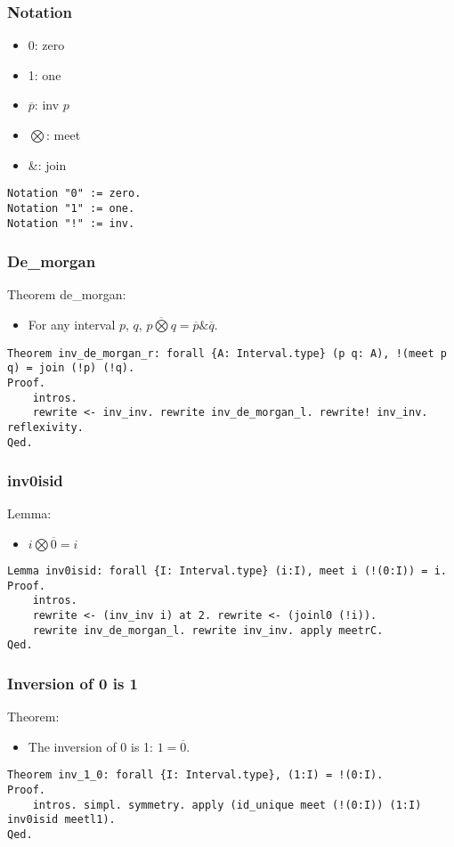 \documentclass[a4paper,10pt]{article} %
\begin{document}
\subsubsection{Notation}
\begin{itemize}
    \item 0: zero
    \item 1: one
    \item \(\overline{p}\): inv \(p\)
    \item \(\bigotimes\): meet
    \item \&: join
\end{itemize}
\begin{lstlisting}
Notation "0" := zero.
Notation "1" := one.
Notation "!" := inv.
\end{lstlisting}

\subsubsection{De\_morgan}
Theorem de\_morgan: 
\begin{itemize}
    \item For any interval \(p\), \(q\), \(\overline{p \bigotimes q} = \overline{p} \& \overline{q}\).
\end{itemize}
\begin{lstlisting}
Theorem inv_de_morgan_r: forall {A: Interval.type} (p q: A), !(meet p q) = join (!p) (!q).
Proof.
    intros.
    rewrite <- inv_inv. rewrite inv_de_morgan_l. rewrite! inv_inv. reflexivity.
Qed.    
\end{lstlisting}

\subsubsection{inv0isid}
Lemma:
\begin{itemize}
    \item $i \bigotimes \overline{0} = i$
\end{itemize}
\begin{lstlisting}
Lemma inv0isid: forall {I: Interval.type} (i:I), meet i (!(0:I)) = i.
Proof.
    intros.
    rewrite <- (inv_inv i) at 2. rewrite <- (joinl0 (!i)). 
    rewrite inv_de_morgan_l. rewrite inv_inv. apply meetrC.
Qed.
\end{lstlisting}

\subsubsection{Inversion of 0 is 1}
Theorem: 
\begin{itemize}
    \item The inversion of 0 is 1: \(1 = \overline{0}\).
\end{itemize}
\begin{lstlisting}
Theorem inv_1_0: forall {I: Interval.type}, (1:I) = !(0:I).
Proof.
    intros. simpl. symmetry. apply (id_unique meet (!(0:I)) (1:I) inv0isid meetl1).
Qed.
\end{lstlisting}
\end{document}
